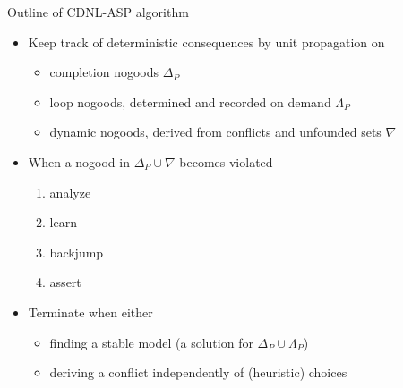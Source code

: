 \begin{frame}{Outline of CDNL-ASP algorithm}
  \begin{itemize}
  \item<2-> \alert<3>{Keep track} of deterministic consequences by \alert<3>{unit propagation} on
    \begin{itemize}
    \item completion nogoods                                         \hfill $\Delta_P$
    \item loop nogoods, determined and recorded \alert<3>{on demand} \hfill $\Lambda_P$\kern 1pt
    \item dynamic nogoods, derived from conflicts and unfounded sets \hfill $\nabla\phantom{_P}$
    \end{itemize}
  \item<5-> When a nogood in $\Delta_P\cup\nabla$ becomes \alert<4>{violated}
    \begin{enumerate}
    \item<6-> \alert<6-10>{analyze}
    \item<6-> \alert<6-10>{learn}
    \item<6-> \alert<6-10>{backjump}
    \item<6-> \alert<6-10>{assert}
    \end{enumerate}
    \item<13-> Terminate when either
    \begin{itemize}
    \item<14-> finding a stable model (a solution for $\Delta_P\cup\Lambda_P$)
    \item<15-> deriving a conflict independently of (heuristic) choices
    \end{itemize}
  \end{itemize}
\end{frame}
